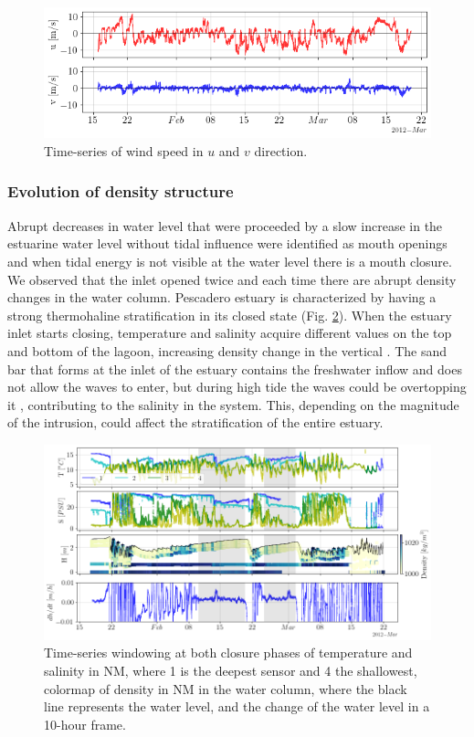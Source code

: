 \documentclass[tesis.tex]{subfiles}
\begin{document}
\begin{figure}[h!]
    \centering
    \includegraphics[width=\textwidth]{Imagenes/wind_vel.png}
    \caption{Time-series of wind speed in $u$ and $v$ direction.}
    \label{fig:windvel}
\end{figure}

\subsubsection{Evolution of density structure}

Abrupt decreases in water level that were proceeded by a slow increase in the estuarine water level without tidal influence were identified as mouth openings and when tidal energy is not visible at the water level there is a mouth closure. We observed that the inlet opened twice and each time there are abrupt density changes in the water column. Pescadero estuary is characterized by having a strong thermohaline stratification in its closed state (Fig. \ref{fig:saltemp}). When the estuary inlet starts closing, temperature and salinity acquire different values on the top and bottom of the lagoon, increasing density change in the vertical \citep{largier2015}. The sand bar that forms at the inlet of the estuary contains the freshwater inflow and does not allow the waves to enter, but during high tide the waves could be overtopping it \citep{laudier2011measured}, contributing to the salinity in the system. This, depending on the magnitude of the intrusion, could affect the stratification of the entire estuary.\\

\begin{figure}[h!]
    \centering
    \includegraphics[scale=0.5]{Imagenes/saltemp.png}
    \caption{Time-series windowing at both closure phases of temperature and salinity in NM, where 1 is the deepest sensor and 4 the shallowest, colormap of density in NM in the water column, where the black line represents the water level, and the change of the water level in a 10-hour frame.}
    \label{fig:saltemp}
\end{figure}
\end{document}

